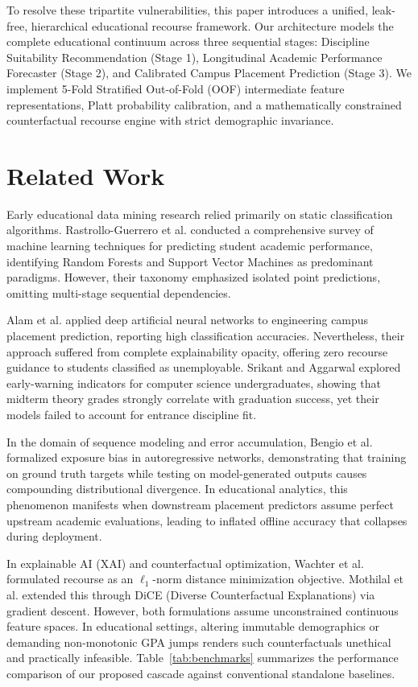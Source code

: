 \documentclass[conference]{IEEEtran}
\begin{document}
To resolve these tripartite vulnerabilities, this paper introduces a unified, leak-free, hierarchical educational recourse framework. Our architecture models the complete educational continuum across three sequential stages: Discipline Suitability Recommendation (Stage 1), Longitudinal Academic Performance Forecaster (Stage 2), and Calibrated Campus Placement Prediction (Stage 3). We implement 5-Fold Stratified Out-of-Fold (OOF) intermediate feature representations, Platt probability calibration, and a mathematically constrained counterfactual recourse engine with strict demographic invariance.

\section{Related Work}
Early educational data mining research relied primarily on static classification algorithms. Rastrollo-Guerrero et al. \cite{rastrollo2020} conducted a comprehensive survey of machine learning techniques for predicting student academic performance, identifying Random Forests and Support Vector Machines as predominant paradigms. However, their taxonomy emphasized isolated point predictions, omitting multi-stage sequential dependencies.

Alam et al. \cite{alam2021} applied deep artificial neural networks to engineering campus placement prediction, reporting high classification accuracies. Nevertheless, their approach suffered from complete explainability opacity, offering zero recourse guidance to students classified as unemployable. Srikant and Aggarwal \cite{srikant2017} explored early-warning indicators for computer science undergraduates, showing that midterm theory grades strongly correlate with graduation success, yet their models failed to account for entrance discipline fit.

In the domain of sequence modeling and error accumulation, Bengio et al. \cite{bengio2015} formalized exposure bias in autoregressive networks, demonstrating that training on ground truth targets while testing on model-generated outputs causes compounding distributional divergence. In educational analytics, this phenomenon manifests when downstream placement predictors assume perfect upstream academic evaluations, leading to inflated offline accuracy that collapses during deployment.

In explainable AI (XAI) and counterfactual optimization, Wachter et al. \cite{wachter2017} formulated recourse as an $\ell_1$-norm distance minimization objective. Mothilal et al. \cite{mothilal2020} extended this through DiCE (Diverse Counterfactual Explanations) via gradient descent. However, both formulations assume unconstrained continuous feature spaces. In educational settings, altering immutable demographics or demanding non-monotonic GPA jumps renders such counterfactuals unethical and practically infeasible. Table~\ref{tab:benchmarks} summarizes the performance comparison of our proposed cascade against conventional standalone baselines.
\end{document}
